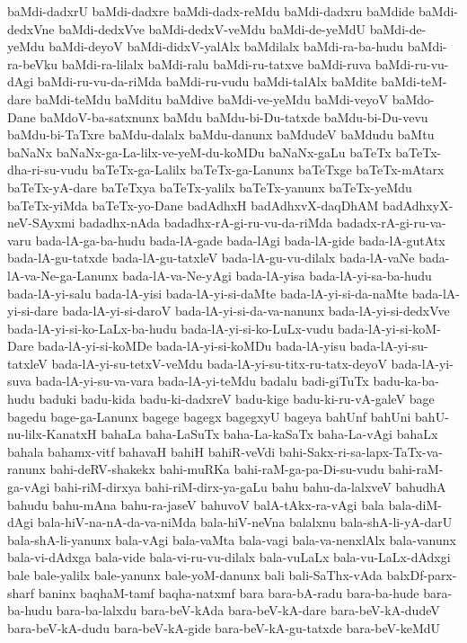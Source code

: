 {baMdi-dadxrU
baMdi-dadxre
baMdi-dadx-reMdu
baMdi-dadxru
baMdide
baMdi-dedxVne
baMdi-dedxVve
baMdi-dedxV-veMdu
baMdi-de-yeMdU
baMdi-de-yeMdu
baMdi-deyoV
baMdi-didxV-yalAlx
baMdilalx
baMdi-ra-ba-hudu
baMdi-ra-beVku
baMdi-ra-lilalx
baMdi-ralu
baMdi-ru-tatxve
baMdi-ruva
baMdi-ru-vu-dAgi
baMdi-ru-vu-da-riMda
baMdi-ru-vudu
baMdi-talAlx
baMdite
baMdi-teM-dare
baMdi-teMdu
baMditu
baMdive
baMdi-ve-yeMdu
baMdi-veyoV
baMdo-Dane
baMdoV-ba-satxnunx
baMdu
baMdu-bi-Du-tatxde
baMdu-bi-Du-vevu
baMdu-bi-TaTxre
baMdu-dalalx
baMdu-danunx
baMdudeV
baMdudu
baMtu
baNaNx
baNaNx-ga-La-lilx-ve-yeM-du-koMDu
baNaNx-gaLu
baTeTx
baTeTx-dha-ri-su-vudu
baTeTx-ga-Lalilx
baTeTx-ga-Lanunx
baTeTxge
baTeTx-mAtarx
baTeTx-yA-dare
baTeTxya
baTeTx-yalilx
baTeTx-yanunx
baTeTx-yeMdu
baTeTx-yiMda
baTeTx-yo-Dane
badAdhxH
badAdhxvX-daqDhAM
badAdhxyX-neV-SAyxmi
badadhx-nAda
badadhx-rA-gi-ru-vu-da-riMda
badadx-rA-gi-ru-va-varu
bada-lA-ga-ba-hudu
bada-lA-gade
bada-lAgi
bada-lA-gide
bada-lA-gutAtx
bada-lA-gu-tatxde
bada-lA-gu-tatxleV
bada-lA-gu-vu-dilalx
bada-lA-vaNe
bada-lA-va-Ne-ga-Lanunx
bada-lA-va-Ne-yAgi
bada-lA-yisa
bada-lA-yi-sa-ba-hudu
bada-lA-yi-salu
bada-lA-yisi
bada-lA-yi-si-daMte
bada-lA-yi-si-da-naMte
bada-lA-yi-si-dare
bada-lA-yi-si-daroV
bada-lA-yi-si-da-va-nanunx
bada-lA-yi-si-dedxVve
bada-lA-yi-si-ko-LaLx-ba-hudu
bada-lA-yi-si-ko-LuLx-vudu
bada-lA-yi-si-koM-Dare
bada-lA-yi-si-koMDe
bada-lA-yi-si-koMDu
bada-lA-yisu
bada-lA-yi-su-tatxleV
bada-lA-yi-su-tetxV-veMdu
bada-lA-yi-su-titx-ru-tatx-deyoV
bada-lA-yi-suva
bada-lA-yi-su-va-vara
bada-lA-yi-teMdu
badalu
badi-giTuTx
badu-ka-ba-hudu
baduki
badu-kida
badu-ki-dadxreV
badu-kige
badu-ki-ru-vA-galeV
bage
bagedu
bage-ga-Lanunx
bagege
bagegx
bagegxyU
bageya
bahUnf
bahUni
bahU-nu-lilx-KanatxH
bahaLa
baha-LaSuTx
baha-La-kaSaTx
baha-La-vAgi
bahaLx
bahala
bahamx-vitf
bahavaH
bahiH
bahiR-veVdi
bahi-Sakx-ri-sa-lapx-TaTx-va-ranunx
bahi-deRV-shakekx
bahi-muRKa
bahi-raM-ga-pa-Di-su-vudu
bahi-raM-ga-vAgi
bahi-riM-dirxya
bahi-riM-dirx-ya-gaLu
bahu
bahu-da-lalxveV
bahudhA
bahudu
bahu-mAna
bahu-ra-jaseV
bahuvoV
balA-tAkx-ra-vAgi
bala
bala-diM-dAgi
bala-hiV-na-nA-da-va-niMda
bala-hiV-neVna
balalxnu
bala-shA-li-yA-darU
bala-shA-li-yanunx
bala-vAgi
bala-vaMta
bala-vagi
bala-va-nenxlAlx
bala-vanunx
bala-vi-dAdxga
bala-vide
bala-vi-ru-vu-dilalx
bala-vuLaLx
bala-vu-LaLx-dAdxgi
bale
bale-yalilx
bale-yanunx
bale-yoM-danunx
bali
bali-SaThx-vAda
balxDf-parx-sharf
baninx
baqhaM-tamf
baqha-natxmf
bara
bara-bA-radu
bara-ba-hude
bara-ba-hudu
bara-ba-lalxdu
bara-beV-kAda
bara-beV-kA-dare
bara-beV-kA-dudeV
bara-beV-kA-dudu
bara-beV-kA-gide
bara-beV-kA-gu-tatxde
bara-beV-keMdU
}
